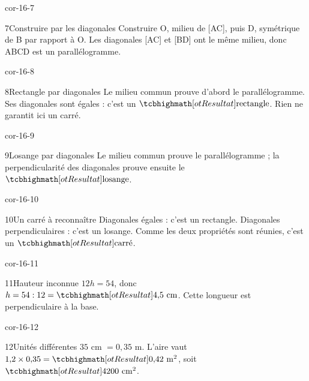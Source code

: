 \begin{blocLivre}{cor-16-7}\begin{corrige}{7}{Construire par les diagonales}
Construire O, milieu de [AC], puis D, symétrique de B par rapport à O. Les diagonales [AC] et [BD] ont le même milieu, donc ABCD est un parallélogramme.
\label{fig-cor-16-7}
\end{corrige}\end{blocLivre}
\begin{blocLivre}{cor-16-8}\begin{corrige}{8}{Rectangle par diagonales}
Le milieu commun prouve d’abord le parallélogramme. Ses diagonales sont égales : c’est un $\res{\text{rectangle}}$. Rien ne garantit ici un carré.
\label{fig-cor-16-8}
\end{corrige}\end{blocLivre}
\begin{blocLivre}{cor-16-9}\begin{corrige}{9}{Losange par diagonales}
Le milieu commun prouve le parallélogramme ; la perpendicularité des diagonales prouve ensuite le $\res{\text{losange}}$.
\label{fig-cor-16-9}
\end{corrige}\end{blocLivre}
\begin{blocLivre}{cor-16-10}\begin{corrige}{10}{Un carré à reconnaître}
Diagonales égales : c’est un rectangle. Diagonales perpendiculaires : c’est un losange. Comme les deux propriétés sont réunies, c’est un $\res{\text{carré}}$.
\label{fig-cor-16-10}
\end{corrige}\end{blocLivre}
\begin{blocLivre}{cor-16-11}\begin{corrige}{11}{Hauteur inconnue}
$12h=54$, donc $h=54:12=\res{4{,}5\ \mathrm{cm}}$. Cette longueur est perpendiculaire à la base.
\label{fig-cor-16-11}
\end{corrige}\end{blocLivre}
\begin{blocLivre}{cor-16-12}\begin{corrige}{12}{Unités différentes}
$35$ cm $=0{,}35$ m. L’aire vaut $1{,}2\times0{,}35=\res{0{,}42\ \mathrm{m}^2}$, soit $\res{4200\ \mathrm{cm}^2}$.
\label{fig-cor-16-12}
\end{corrige}\end{blocLivre}
